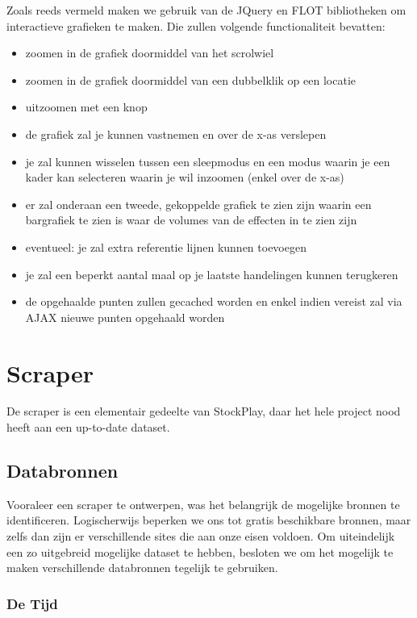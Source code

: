 Zoals reeds vermeld maken we gebruik van de JQuery en FLOT bibliotheken om interactieve grafieken te maken. Die zullen volgende functionaliteit bevatten:
\begin{itemize}
\item{zoomen in de grafiek doormiddel van het scrolwiel}
\item{zoomen in de grafiek doormiddel van een dubbelklik op een locatie}
\item{uitzoomen met een knop}
\item{de grafiek zal je kunnen vastnemen en over de x-as verslepen}
\item{je zal kunnen wisselen tussen een sleepmodus en een modus waarin je een kader kan selecteren waarin je wil inzoomen (enkel over de x-as)}
\item{er zal onderaan een tweede, gekoppelde grafiek te zien zijn waarin een bargrafiek te zien is waar de volumes van de effecten in te zien zijn}
\item{eventueel: je zal extra referentie lijnen kunnen toevoegen}
\item{je zal een beperkt aantal maal op je laatste handelingen kunnen terugkeren}
\item{de opgehaalde punten zullen gecached worden en enkel indien vereist zal via AJAX nieuwe punten opgehaald worden}
\end{itemize}


%
%

\chapter{Scraper}

De scraper is een elementair gedeelte van StockPlay, daar het hele project nood heeft aan een up-to-date dataset.

\section{Databronnen}

Vooraleer een scraper te ontwerpen, was het belangrijk de mogelijke bronnen te identificeren. Logischerwijs beperken we ons tot gratis beschikbare bronnen, maar zelfs dan zijn er verschillende sites die aan onze eisen voldoen. Om uiteindelijk een zo uitgebreid mogelijke dataset te hebben, besloten we om het mogelijk te maken verschillende databronnen tegelijk te gebruiken.

\subsection{De Tijd}

